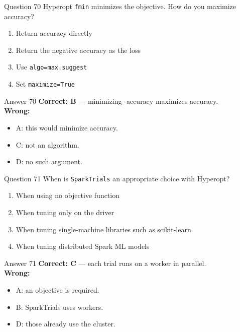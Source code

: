 \documentclass[aspectratio=169,11pt]{beamer}
\begin{document}
	\begin{frame}{Question 70}
		Hyperopt \texttt{fmin} minimizes the objective. How do you maximize accuracy?
		\begin{enumerate}[label=\Alph*.]
			\item Return accuracy directly
			\item Return the negative accuracy as the loss
			\item Use \texttt{algo=max.suggest}
			\item Set \texttt{maximize=True}
		\end{enumerate}
	\end{frame}
	\begin{frame}{Answer 70}
		\textbf{Correct: B} --- minimizing -accuracy maximizes accuracy.\\
		\vspace{0.5em}
		\textbf{Wrong:}
		\begin{itemize}
			\item A: this would minimize accuracy.
			\item C: not an algorithm.
			\item D: no such argument.
		\end{itemize}
	\end{frame}
	
	\begin{frame}{Question 71}
		When is \texttt{SparkTrials} an appropriate choice with Hyperopt?
		\begin{enumerate}[label=\Alph*.]
			\item When using no objective function
			\item When tuning only on the driver
			\item When tuning single-machine libraries such as scikit-learn
			\item When tuning distributed Spark ML models
		\end{enumerate}
	\end{frame}
	\begin{frame}{Answer 71}
		\textbf{Correct: C} --- each trial runs on a worker in parallel.\\
		\vspace{0.5em}
		\textbf{Wrong:}
		\begin{itemize}
			\item A: an objective is required.
			\item B: SparkTrials uses workers.
			\item D: those already use the cluster.
		\end{itemize}
	\end{frame}
	
\end{document}
